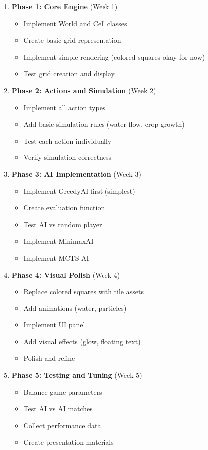 \documentclass[12pt,a4paper]{article}
\begin{document}
\begin{enumerate}
    \item \textbf{Phase 1: Core Engine} (Week 1)
    \begin{itemize}
        \item Implement World and Cell classes
        \item Create basic grid representation
        \item Implement simple rendering (colored squares okay for now)
        \item Test grid creation and display
    \end{itemize}
    
    \item \textbf{Phase 2: Actions and Simulation} (Week 2)
    \begin{itemize}
        \item Implement all action types
        \item Add basic simulation rules (water flow, crop growth)
        \item Test each action individually
        \item Verify simulation correctness
    \end{itemize}
    
    \item \textbf{Phase 3: AI Implementation} (Week 3)
    \begin{itemize}
        \item Implement GreedyAI first (simplest)
        \item Create evaluation function
        \item Test AI vs random player
        \item Implement MinimaxAI
        \item Implement MCTS AI
    \end{itemize}
    
    \item \textbf{Phase 4: Visual Polish} (Week 4)
    \begin{itemize}
        \item Replace colored squares with tile assets
        \item Add animations (water, particles)
        \item Implement UI panel
        \item Add visual effects (glow, floating text)
        \item Polish and refine
    \end{itemize}
    
    \item \textbf{Phase 5: Testing and Tuning} (Week 5)
    \begin{itemize}
        \item Balance game parameters
        \item Test AI vs AI matches
        \item Collect performance data
        \item Create presentation materials
    \end{itemize}
\end{enumerate}
\end{document}
